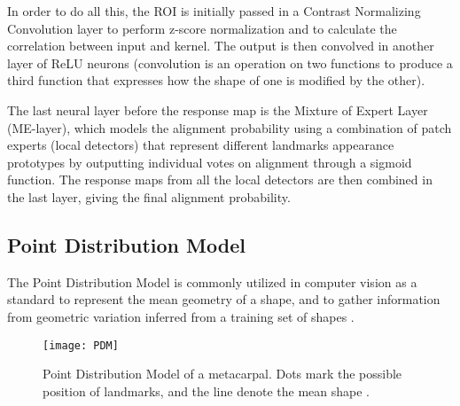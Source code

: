 In order to do all this, the ROI is initially passed in a Contrast Normalizing Convolution layer to perform z-score normalization and to calculate the correlation between input and kernel. The output is then convolved in another layer of ReLU neurons (convolution is an operation on two functions to produce a third function that expresses how the shape of one is modified by the other).

The last neural layer before the response map is the Mixture of Expert Layer (ME-layer), which models the alignment probability using a combination of patch experts (local detectors) that represent different landmarks appearance prototypes by outputting individual votes on alignment through a sigmoid function. The response maps from all the local detectors are then combined in the last layer, giving the final alignment probability.

\subsection{Point Distribution Model}
The Point Distribution Model is commonly utilized in computer vision as a standard to represent the mean geometry of a shape, and to gather information from geometric variation inferred from a training set of shapes \cite{wiki:PDM}. 

\begin{figure}[H]
	\centering
	\texttt{[image: PDM]}
	\caption{Point Distribution Model of a metacarpal. Dots mark the possible position of landmarks, and the line denote the mean shape \cite{PDM}.}
	\label{fig:PDM}
\end{figure}

